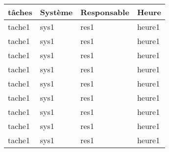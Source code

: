 \Large\begin{tabularx}{\linewidth}{
    |>{\hsize=2.5\hsize}X|%
    >{\hsize=0.5\hsize}X|%
    >{\hsize=0.75\hsize}X|%
    >{\hsize=0.25\hsize}X|%
  }
    \hline
    tâches & Système & Responsable & Heure\\\hline
    tache1 & sys1 & res1 & heure1\\\hline
    tache1 & sys1 & res1 & heure1\\\hline
    tache1 & sys1 & res1 & heure1\\\hline
    tache1 & sys1 & res1 & heure1\\\hline
    tache1 & sys1 & res1 & heure1\\\hline
    tache1 & sys1 & res1 & heure1\\\hline
    tache1 & sys1 & res1 & heure1\\\hline
    tache1 & sys1 & res1 & heure1\\\hline
    tache1 & sys1 & res1 & heure1\\\hline
  \end{tabularx}
     